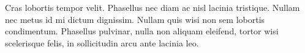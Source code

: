 
Cras lobortis tempor velit. Phasellus nec diam ac nisl lacinia tristique. Nullam nec metus id mi dictum dignissim. Nullam quis wisi non sem lobortis condimentum. Phasellus pulvinar, nulla non aliquam eleifend, tortor wisi scelerisque felis, in sollicitudin arcu ante lacinia leo.